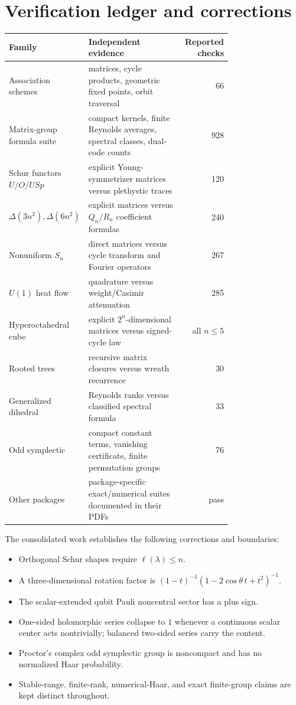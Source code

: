 \documentclass[10pt]{article}
\begin{document}
\section{Verification ledger and corrections}

\begingroup\small
\setlength{\LTpre}{3pt}\setlength{\LTpost}{4pt}
\begin{longtable}{@{}p{0.25\linewidth}p{0.50\linewidth}r@{}}
\toprule
Family & Independent evidence & Reported checks\\\midrule
\endhead
Association schemes & matrices, cycle products, geometric fixed points, orbit traversal & 66\\
Matrix-group formula suite & compact kernels, finite Reynolds averages, spectral classes, dual-code counts & 928\\
Schur functors $U/O/USp$ & explicit Young-symmetrizer matrices versus plethystic traces & 120\\
$\Delta(3n^2),\Delta(6n^2)$ & explicit matrices versus $Q_n/R_n$ coefficient formulas & 240\\
Nonuniform $S_n$ & direct matrices versus cycle transform and Fourier operators & 267\\
$U(1)$ heat flow & quadrature versus weight/Casimir attenuation & 285\\
Hyperoctahedral cube & explicit $2^n$-dimensional matrices versus signed-cycle law & all $n\le5$\\
Rooted trees & recursive matrix closures versus wreath recurrence & 30\\
Generalized dihedral & Reynolds ranks versus classified spectral formula & 33\\
Odd symplectic & compact constant terms, vanishing certificate, finite permutation groups & 76\\
Other packages & package-specific exact/numerical suites documented in their PDFs & pass\\
\bottomrule
\end{longtable}
\endgroup

The consolidated work establishes the following corrections and boundaries:
\begin{itemize}
\item Orthogonal Schur shapes require $\ell(\lambda)\le n$.
\item A three-dimensional rotation factor is
$(1-t)^{-1}(1-2\cos\theta\,t+t^2)^{-1}$.
\item The scalar-extended qubit Pauli noncentral sector has a plus sign.
\item One-sided holomorphic series collapse to $1$ whenever a continuous
scalar center acts nontrivially; balanced two-sided series carry the content.
\item Proctor's complex odd symplectic group is noncompact and has no
normalized Haar probability.
\item Stable-range, finite-rank, numerical-Haar, and exact finite-group claims
are kept distinct throughout.
\end{itemize}
\end{document}
